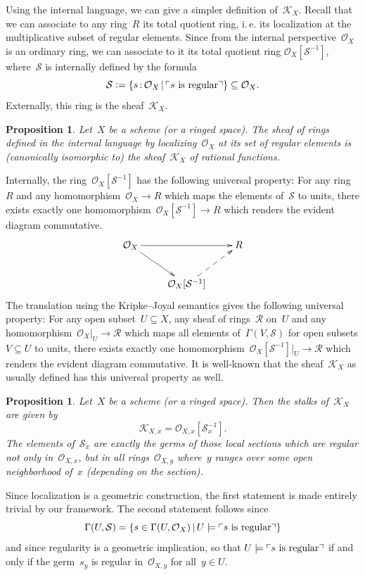 \documentclass[10pt,reqno,a4paper]{amsbook}
\makeatletter
\theoremstyle{definition}
\theoremstyle{plain}
\newtheorem{prop}[defn]{Proposition}
\theoremstyle{remark}
\renewcommand{\O}{\mathcal{O}}
\newcommand{\K}{\mathcal{K}}
\newcommand{\R}{\mathcal{R}}
\renewcommand{\S}{\mathcal{S}}
\newcommand{\?}{\,{:}\,}
\renewcommand{\_}{\mathpunct{.}\,}
\newcommand{\speak}[1]{\ulcorner\text{\textnormal{#1}}\urcorner}
\newcommand{\ie}{i.\,e.\@\xspace}
\newcommand{\defeq}{\vcentcolon=}
\renewenvironment{proof}[1][\proofname]{\par
  \pushQED{\qed}%
  \normalfont \topsep6\p@\@plus6\p@\relax
  \trivlist
  \item[\hskip\labelsep
        \itshape
    #1\@addpunct{.}]\ignorespaces
}{%
  \popQED\endtrivlist\@endpefalse
}
\makeatother
\begin{document}
Using the internal language, we can give a simpler definition of~$\K_X$.
Recall that we can associate to any ring~$R$ its total quotient ring, \ie
its localization at the multiplicative subset of regular elements. Since from
the internal perspective~$\O_X$ is an ordinary ring, we can associate to it its
total quotient ring $\O_X[\S^{-1}]$,
where~$\S$ is internally defined by the formula
\[ \S \defeq \{ s\?\O_X \,|\, \speak{$s$ is regular} \} \subseteq \O_X. \]
Externally, this ring is the sheaf~$\K_X$.
\begin{prop}\label{prop:kx-internally}
Let~$X$ be a scheme (or a ringed space). The sheaf of rings defined
in the internal language by localizing~$\O_X$ at its set of regular elements is
(canonically isomorphic to) the sheaf~$\K_X$ of rational functions.
\end{prop}
\begin{proof}Internally, the ring~$\O_X[\S^{-1}]$ has the following
universal property: For any ring~$R$ and any homomorphism~$\O_X \to R$ which
maps the elements of~$\S$ to units, there exists exactly one
homomorphism~$\O_X[\S^{-1}] \to R$ which renders the evident diagram commutative.
\[ \xymatrix{
  \O_X \ar[rr] \ar[dr] && R \\
  & \O_X[\S^{-1}] \ar@{-->}[ru]
} \]
The translation using the Kripke--Joyal semantics gives the following universal
property: For any open subset~$U \subseteq X$, any sheaf of rings~$\R$ on~$U$ and any
homomorphism~$\O_X|_U \to \R$ which maps all elements of~$\Gamma(V,\S)$ for open subsets $V
\subseteq U$ to units, there exists exactly one homomorphism~$\O_X[\S^{-1}]|_U \to
\R$ which renders the evident diagram commutative.
It is well-known that the sheaf~$\K_X$ as usually defined has
this universal property as well.
\end{proof}

\begin{prop}\label{prop:stalks-kx}
Let~$X$ be a scheme (or a ringed space). Then the stalks of~$\K_X$
are given by
\[ \K_{X,x} = \O_{X,x}[\S_x^{-1}]. \]
The elements of~$\S_x$ are exactly the germs of those local sections which are
regular not only in~$\O_{X,x}$, but in all rings~$\O_{X,y}$ where~$y$
ranges over some open neighborhood of~$x$ (depending on the section).\end{prop}
\begin{proof}
Since localization is a geometric construction, the first statement is made entirely
trivial by our framework. The second statement follows since
\[ \Gamma(U,\S) = \{ s\in\Gamma(U,\O_X) \,|\, U \models \speak{$s$ is regular}
\} \]
and since regularity is a geometric implication, so that
$U \models \speak{$s$ is regular}$ if and only if the germ~$s_y$ is regular
in~$\O_{X,y}$ for all~$y \in U$.
\end{proof}
\end{document}

